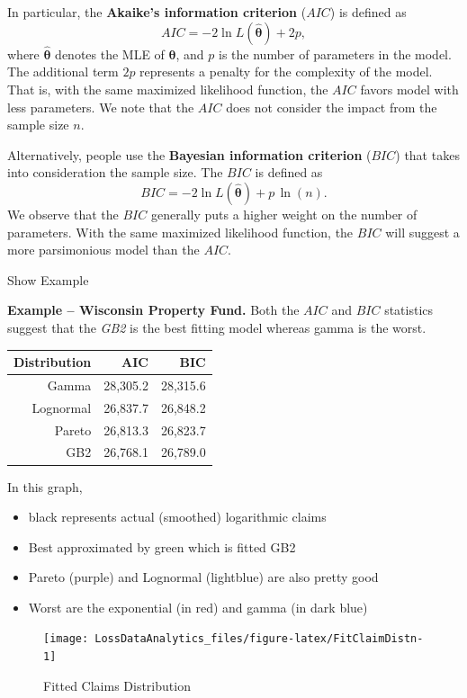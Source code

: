 \documentclass[]{book}
\theoremstyle{definition}
\theoremstyle{definition}
\theoremstyle{definition}
\theoremstyle{remark}
\begin{document}
In particular, the \textbf{Akaike's information criterion} (\(AIC\)) is
defined as \[AIC = -2\ln L(\hat{\boldsymbol \theta}) + 2p,\] where
\(\hat{\boldsymbol \theta}\) denotes the MLE of
\({\boldsymbol \theta}\), and \(p\) is the number of parameters in the
model. The additional term \(2 p\) represents a penalty for the
complexity of the model. That is, with the same maximized likelihood
function, the \(AIC\) favors model with less parameters. We note that
the \(AIC\) does not consider the impact from the sample size \(n\).

Alternatively, people use the \textbf{Bayesian information criterion}
(\(BIC\)) that takes into consideration the sample size. The \(BIC\) is
defined as \[BIC = -2\ln L(\hat{\boldsymbol \theta}) + p\,\ln(n).\] We
observe that the \(BIC\) generally puts a higher weight on the number of
parameters. With the same maximized likelihood function, the \(BIC\)
will suggest a more parsimonious model than the \(AIC\).

Show Example

\hypertarget{EXM:S1:AIC}{}
\textbf{Example -- Wisconsin Property Fund.} Both the \(AIC\) and
\(BIC\) statistics suggest that the \emph{GB2} is the best fitting model
whereas gamma is the worst.

\begin{longtable}[]{@{}rrr@{}}
\toprule
Distribution & AIC & BIC\tabularnewline
\midrule
\endhead
Gamma & 28,305.2 & 28,315.6\tabularnewline
Lognormal & 26,837.7 & 26,848.2\tabularnewline
Pareto & 26,813.3 & 26,823.7\tabularnewline
GB2 & 26,768.1 & 26,789.0\tabularnewline
\bottomrule
\end{longtable}

In this graph,

\begin{itemize}
\item
  black represents actual (smoothed) logarithmic claims
\item
  Best approximated by green which is fitted GB2
\item
  Pareto (purple) and Lognormal (lightblue) are also pretty good
\item
  Worst are the exponential (in red) and gamma (in dark blue)
\end{itemize}

\begin{figure}

{\centering \texttt{[image: LossDataAnalytics\_files/figure-latex/FitClaimDistn-1]} 

}

\caption{Fitted Claims Distribution}\label{fig:FitClaimDistn}
\end{figure}
\end{document}
